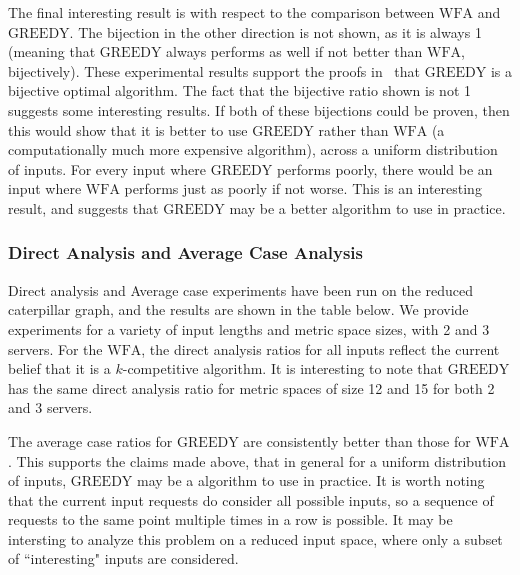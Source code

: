 The final interesting result is with respect to the comparison between $\mathrm{WFA}$ and $\mathrm{GREEDY}$. The bijection in the other direction is not shown, as it is always 1 (meaning that $\mathrm{GREEDY}$ always performs as well if not better than $\mathrm{WFA}$, bijectively). These experimental results support the proofs in~\cite{bij2016} that $\mathrm{GREEDY}$ is a bijective optimal algorithm. The fact that the bijective ratio shown is not 1 suggests some interesting results. If both of these bijections could be proven, then this would show that it is better to use $\mathrm{GREEDY}$ rather than $\mathrm{WFA}$ (a computationally much more expensive algorithm), across a uniform distribution of inputs. For every input where $\mathrm{GREEDY}$ performs poorly, there would be an input where $\mathrm{WFA}$ performs just as poorly if not worse. This is an interesting result, and suggests that $\mathrm{GREEDY}$ may be a better algorithm to use in practice.

\subsubsection*{Direct Analysis and Average Case Analysis}
Direct analysis and Average case experiments have been run on the reduced caterpillar graph, and the results are shown in the table below. We provide experiments for a variety of input lengths and metric space sizes, with 2 and 3 servers. For the $\mathrm{WFA}$, the direct analysis ratios for all inputs reflect the current belief that it is a $k$-competitive algorithm. It is interesting to note that $\mathrm{GREEDY}$ has the same direct analysis ratio for metric spaces of size 12 and 15 for both 2 and 3 servers.

The average case ratios for $\mathrm{GREEDY}$ are consistently better than those for $\mathrm{WFA}$. This supports the claims made above, that in general for a uniform distribution of inputs, $\mathrm{GREEDY}$ may be a algorithm to use in practice. It is worth noting that the current input requests do consider all possible inputs, so a sequence of requests to the same point multiple times in a row is possible. It may be intersting to analyze this problem on a reduced input space, where only a subset of ``interesting" inputs are considered.

